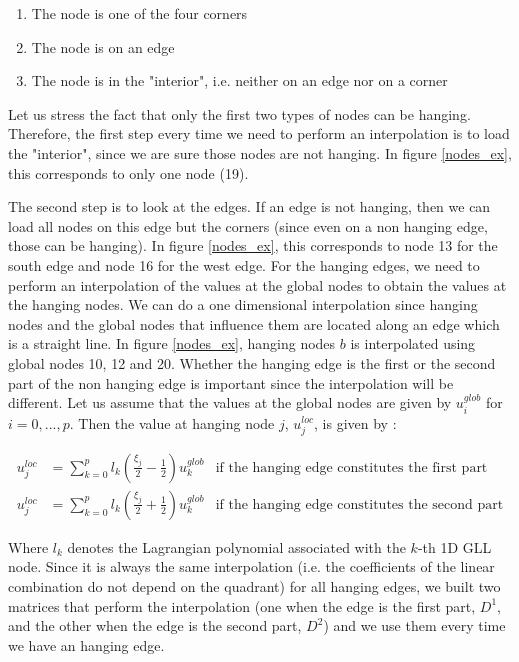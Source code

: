 \begin{enumerate}
\item The node is one of the four corners
\item The node is on an edge
\item The node is in the "interior", i.e. neither on an edge nor on a corner
\end{enumerate}

Let us stress the fact that only the first two types of nodes can be hanging. Therefore, the first step every time we need to perform an interpolation is to load the "interior", since we are sure those nodes are not hanging. In figure \ref{nodes_ex}, this corresponds to only one node (19).

The second step is to look at the edges. If an edge is not hanging, then we can load all nodes on this edge but the corners (since even on a non hanging edge, those can be hanging). In figure \ref{nodes_ex}, this corresponds to node 13 for the south edge and node 16 for the west edge. For the hanging edges, we need to perform an interpolation of the values at the global nodes to obtain the values at the hanging nodes. We can do a one dimensional interpolation since hanging nodes and the global nodes that influence them are located along an edge which is a straight line. In figure \ref{nodes_ex}, hanging nodes $b$ is interpolated using global nodes 10, 12 and 20.  Whether the hanging edge is the first or the second part of the non hanging edge is important since the interpolation will be different. Let us assume that the values at the global nodes are given by $u^{glob}_i$ for $i=0,...,p$. Then the value at hanging node $j$, $u^{loc}_j$, is given by : 

\begin{align*}
u^{loc}_j &= \sum_{k=0}^p l_k\left(\frac{\xi_j}{2}-\frac{1}{2}\right) u_k^{glob} &\text{if the hanging edge constitutes the first part}\\
u^{loc}_j &= \sum_{k=0}^p l_k\left(\frac{\xi_j}{2}+\frac{1}{2}\right) u_k^{glob} &\text{if the hanging edge constitutes the second part}
\end{align*}

Where $l_k$ denotes the Lagrangian polynomial associated with the $k$-th 1D GLL node. Since it is always the same interpolation (i.e. the coefficients of the linear combination do not depend on the quadrant) for all hanging edges, we built two matrices that perform the interpolation (one when the edge is the first part, $D^1$, and the other when the edge is the second part, $D^2$) and we use them every time we have an hanging edge. 

